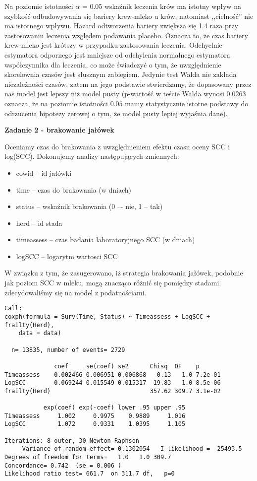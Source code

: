 \documentclass[]{article}
\begin{document}
Na poziomie istotności $\alpha$ = 0.05 wskaźnik leczenia krów ma istotny
wpływ na szybkość odbudowywania się bariery krew-mleko u krów, natomiast
,,cielność'' nie ma istotnego wpływu. Hazard odtworzenia bariery
zwiększa się 1.4 raza przy zastosowaniu leczenia względem podawania
placebo. Oznacza to, że czas  bariery krew-mleko
jest krótszy w przypadku zastosowania leczenia. Odchyelnie estymatora
odpornego jest mniejsze od odchylenia normalnego estymatora
współczynnika dla leczenia, co może świadczyć o tym, że uwzględnienie
skorelownia czasów jest słusznym zabiegiem. Jedynie test Walda nie
zakłada niezależności czasów, zatem na jego podstawie stwierdzamy, że
dopasowany przez nas model jest lepszy niż model pusty (p-wartość w
teście Walda wynosi 0.0263 oznacza, że na poziomie istotności $0.05$
mamy statystycznie istotne podstawy do odrzucenia hipotezy zerowej o
tym, że model pusty lepiej wyjaśnia dane).

\newpage
\textbf{Zadanie 2 - brakowanie jałówek}

Oceniamy czas do brakowania z uwzględnieniem efektu czasu oceny SCC i
log(SCC). Dokonujemy analizy następujących zmiennych:

\begin{itemize}
\item cowid -- id jałówki
\item time -- czas do brakowania (w dniach)
\item status -- wskaźnik brakowania (0 –- nie, 1 -- tak)
\item herd -- id stada
\item timeassess -- czas badania laboratoryjnego SCC (w dniach)
\item logSCC -- logarytm wartosci SCC
\end{itemize}

W związku z tym, że zasugerowano, iż strategia brakowania jałówek,
podobnie jak poziom SCC w mleku, mogą znacząco różnić się pomiędzy
stadami, zdecydowaliśmy się na model z podatnościami.

\begin{verbatim}
Call:
coxph(formula = Surv(Time, Status) ~ Timeassess + LogSCC + frailty(Herd), 
    data = data)

  n= 13835, number of events= 2729 

              coef     se(coef) se2      Chisq  DF    p      
Timeassess    0.002466 0.006951 0.006868   0.13   1.0 7.2e-01
LogSCC        0.069244 0.015549 0.015317  19.83   1.0 8.5e-06
frailty(Herd)                            357.62 309.7 3.1e-02

           exp(coef) exp(-coef) lower .95 upper .95
Timeassess     1.002     0.9975    0.9889     1.016
LogSCC         1.072     0.9331    1.0395     1.105

Iterations: 8 outer, 30 Newton-Raphson
     Variance of random effect= 0.1302054   I-likelihood = -25493.5 
Degrees of freedom for terms=   1.0   1.0 309.7 
Concordance= 0.742  (se = 0.006 )
Likelihood ratio test= 661.7  on 311.7 df,   p=0
\end{verbatim}
\end{document}
